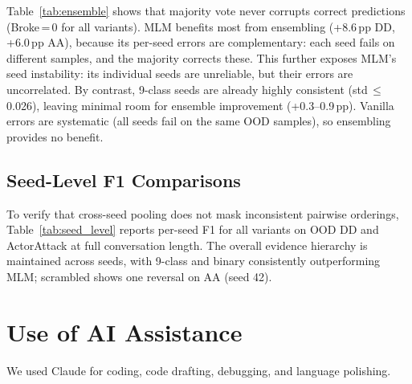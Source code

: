 Table~\ref{tab:ensemble} shows that majority vote never corrupts correct predictions (Broke\,=\,0 for all variants). MLM benefits most from ensembling (+8.6\,pp DD, +6.0\,pp AA), because its per-seed errors are complementary: each seed fails on different samples, and the majority corrects these. This further exposes MLM's seed instability: its individual seeds are unreliable, but their errors are uncorrelated. By contrast, 9-class seeds are already highly consistent (std\,$\leq$\,0.026), leaving minimal room for ensemble improvement (+0.3--0.9\,pp). Vanilla errors are systematic (all seeds fail on the same OOD samples), so ensembling provides no benefit.

\subsection{Seed-Level F1 Comparisons}
\label{app:seed_level}

To verify that cross-seed pooling does not mask inconsistent pairwise orderings, Table~\ref{tab:seed_level} reports per-seed F1 for all variants on OOD DD and ActorAttack at full conversation length. The overall evidence hierarchy is maintained across seeds, with 9-class and binary consistently outperforming MLM; scrambled shows one reversal on AA (seed 42).

\begin{table}[h]
\centering
\small
\caption{Per-seed F1 on OOD Full for key variants (seeds 42, 123, 456). The relative ordering is consistent across seeds.}
\label{tab:seed_level}
\end{table}

\section*{Use of AI Assistance}
We used Claude for coding, code drafting, debugging, and language polishing.
